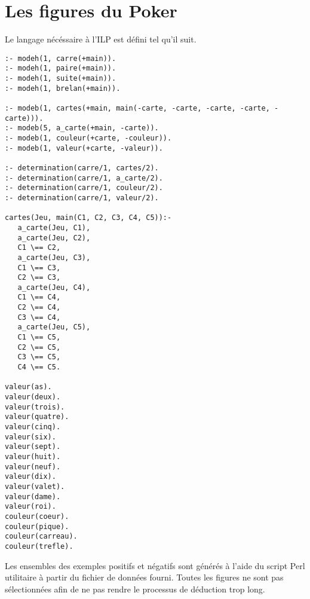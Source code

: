 \documentclass[a4paper,12pt]{article}
\begin{document}
\section{Les figures du Poker}

Le langage nécéssaire à l'ILP est défini tel qu'il suit.

\begin{lstlisting}[frame=single]
:- modeh(1, carre(+main)).
:- modeh(1, paire(+main)).
:- modeh(1, suite(+main)).
:- modeh(1, brelan(+main)).

:- modeb(1, cartes(+main, main(-carte, -carte, -carte, -carte, -carte))).
:- modeb(5, a_carte(+main, -carte)).
:- modeb(1, couleur(+carte, -couleur)).
:- modeb(1, valeur(+carte, -valeur)).

:- determination(carre/1, cartes/2).
:- determination(carre/1, a_carte/2).
:- determination(carre/1, couleur/2).
:- determination(carre/1, valeur/2).

cartes(Jeu, main(C1, C2, C3, C4, C5)):-
   a_carte(Jeu, C1),
   a_carte(Jeu, C2),
   C1 \== C2,
   a_carte(Jeu, C3),
   C1 \== C3,
   C2 \== C3,
   a_carte(Jeu, C4),
   C1 \== C4,
   C2 \== C4,
   C3 \== C4,
   a_carte(Jeu, C5),
   C1 \== C5,
   C2 \== C5,
   C3 \== C5,
   C4 \== C5.

valeur(as).
valeur(deux).
valeur(trois).
valeur(quatre).
valeur(cinq).
valeur(six).
valeur(sept).
valeur(huit).
valeur(neuf).
valeur(dix).
valeur(valet).
valeur(dame).
valeur(roi).
couleur(coeur).
couleur(pique).
couleur(carreau).
couleur(trefle).
\end{lstlisting}

Les ensembles des exemples positifs et négatifs sont générés à l'aide du script Perl utilitaire à partir du fichier de données fourni. Toutes les figures ne sont pas sélectionnées afin de ne pas rendre le processus de déduction trop long.
\end{document}
